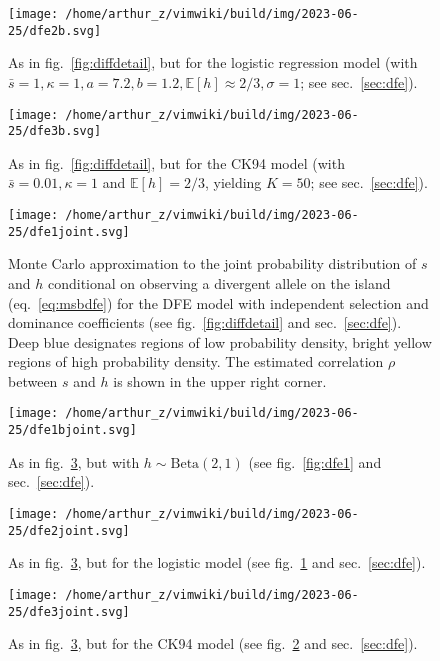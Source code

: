 \documentclass[
  11pt,
]{article}
\begin{document}
\begin{figure}
\hypertarget{fig:dfe2}{%
\centering
\texttt{[image: /home/arthur\_z/vimwiki/build/img/2023-06-25/dfe2b.svg]}
\caption{As in fig.~\ref{fig:diffdetail}, but for the logistic
regression model (with
\(\bar{s} = 1, \kappa=1, a=7.2, b=1.2, \mathbb{E}[h] \approx 2/3, \sigma=1\);
see sec.~\ref{sec:dfe}).}\label{fig:dfe2}
}
\end{figure}

\begin{figure}
\hypertarget{fig:dfe3}{%
\centering
\texttt{[image: /home/arthur\_z/vimwiki/build/img/2023-06-25/dfe3b.svg]}
\caption{As in fig.~\ref{fig:diffdetail}, but for the CK94 model (with
\(\bar{s}=0.01, \kappa=1\) and \(\mathbb{E}[h] = 2/3\), yielding
\(K=50\); see sec.~\ref{sec:dfe}).}\label{fig:dfe3}
}
\end{figure}

\begin{figure}
\hypertarget{fig:dfe1j}{%
\centering
\texttt{[image: /home/arthur\_z/vimwiki/build/img/2023-06-25/dfe1joint.svg]}
\caption{Monte Carlo approximation to the joint probability distribution
of \(s\) and \(h\) conditional on observing a divergent allele on the
island (eq.~\ref{eq:msbdfe}) for the DFE model with independent
selection and dominance coefficients (see fig.~\ref{fig:diffdetail} and
sec.~\ref{sec:dfe}). Deep blue designates regions of low probability
density, bright yellow regions of high probability density. The
estimated correlation \(\rho\) between \(s\) and \(h\) is shown in the
upper right corner.}\label{fig:dfe1j}
}
\end{figure}

\begin{figure}
\hypertarget{fig:dfe1bj}{%
\centering
\texttt{[image: /home/arthur\_z/vimwiki/build/img/2023-06-25/dfe1bjoint.svg]}
\caption{As in fig.~\ref{fig:dfe1j}, but with
\(h \sim \mathrm{Beta}(2,1)\) (see fig.~\ref{fig:dfe1} and
sec.~\ref{sec:dfe}).}\label{fig:dfe1bj}
}
\end{figure}

\begin{figure}
\hypertarget{fig:dfe2j}{%
\centering
\texttt{[image: /home/arthur\_z/vimwiki/build/img/2023-06-25/dfe2joint.svg]}
\caption{As in fig.~\ref{fig:dfe1j}, but for the logistic model (see
fig.~\ref{fig:dfe2} and sec.~\ref{sec:dfe}).}\label{fig:dfe2j}
}
\end{figure}

\begin{figure}
\hypertarget{fig:dfe3j}{%
\centering
\texttt{[image: /home/arthur\_z/vimwiki/build/img/2023-06-25/dfe3joint.svg]}
\caption{As in fig.~\ref{fig:dfe1j}, but for the CK94 model (see
fig.~\ref{fig:dfe3} and sec.~\ref{sec:dfe}).}\label{fig:dfe3j}
}
\end{figure}
\end{document}
